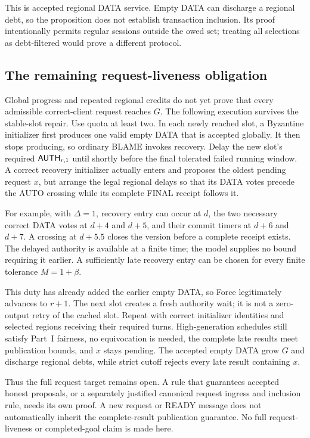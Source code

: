 This is accepted regional DATA service. Empty DATA can discharge a
regional debt, so the proposition does not establish transaction
inclusion. Its proof intentionally permits regular sessions outside
the owed set; treating all selections as debt-filtered would prove a
different protocol.

\subsection{The remaining request-liveness obligation}
\label{sec:v35-request-limit}
Global progress and repeated regional credits do not yet prove that
every admissible correct-client request reaches $G$. The following
execution survives the stable-slot repair. Use quota at least two.
In each newly reached slot, a Byzantine initializer first produces one
valid empty DATA that is accepted globally. It then stops producing,
so ordinary BLAME invokes recovery. Delay the new slot's required
$\mathsf{AUTH}_{r,1}$ until shortly before the final tolerated failed
running window. A correct recovery initializer actually enters and
proposes the oldest pending request $x$, but arrange the legal regional
delays so that its DATA votes precede the AUTO crossing while its
complete FINAL receipt follows it.

For example, with $\Delta=1$, recovery entry can occur at $d$,
the two necessary correct DATA votes at $d+4$ and $d+5$, and their
commit timers at $d+6$ and $d+7$. A crossing at $d+5.5$ closes the
version before a complete receipt exists. The delayed authority is
available at a finite time; the model supplies no bound requiring it
earlier. A sufficiently late recovery entry can be chosen for every
finite tolerance $M=1+\beta$.

This duty has already added the earlier empty DATA, so Force legitimately
advances to $r+1$. The next slot creates a fresh authority wait; it is
not a zero-output retry of the cached slot. Repeat with correct
initializer identities and selected regions receiving their required
turns. High-generation schedules still satisfy Part~I fairness, no
equivocation is needed, the complete late results meet publication
bounds, and $x$ stays pending. The accepted empty DATA grow $G$ and
discharge regional debts, while strict cutoff rejects every late result
containing $x$.

Thus the full request target remains open. A rule that guarantees
accepted honest proposals, or a separately justified canonical request
ingress and inclusion rule, needs its own proof. A new request or READY
message does not automatically inherit the complete-result publication
guarantee. No full request-liveness or completed-goal claim is made here.

